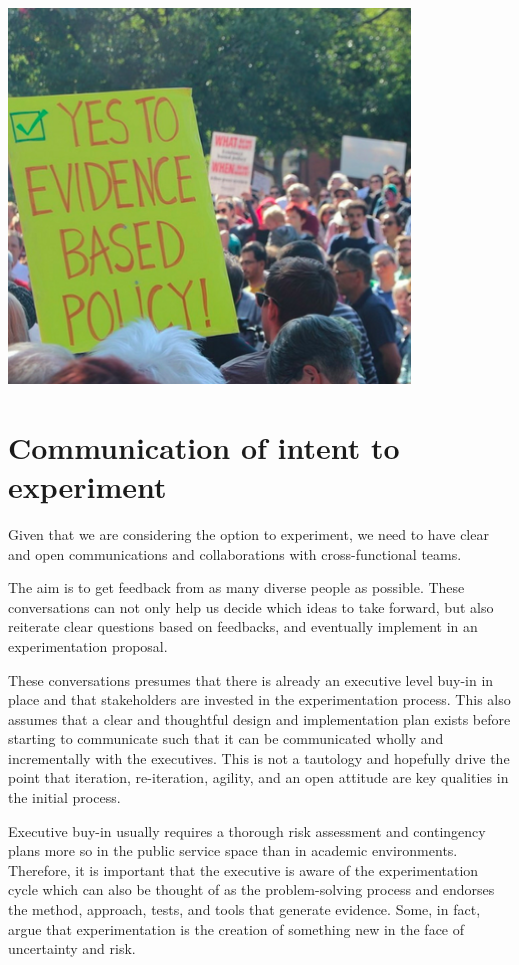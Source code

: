 \documentclass[]{book}
\begin{document}
\includegraphics[width=0.8\textwidth,height=\textheight]{fig/march4science.png}

\hypertarget{communication-of-intent-to-experiment}{%
\section{Communication of intent to experiment}\label{communication-of-intent-to-experiment}}

Given that we are considering the option to experiment, we need to have clear and open communications and collaborations with cross-functional teams.

The aim is to get feedback from as many diverse people as possible. These conversations can not only help us decide which ideas to take forward, but also reiterate clear questions based on feedbacks, and eventually implement in an experimentation proposal.

These conversations presumes that there is already an executive level buy-in in place and that stakeholders are invested in the experimentation process. This also assumes that a clear and thoughtful design and implementation plan exists before starting to communicate such that it can be communicated wholly and incrementally with the executives. This is not a tautology and hopefully drive the point that iteration, re-iteration, agility, and an open attitude are key qualities in the initial process.

Executive buy-in usually requires a thorough risk assessment and contingency plans more so in the public service space than in academic environments. Therefore, it is important that the executive is aware of the experimentation cycle which can also be thought of as the problem-solving process and endorses the method, approach, tests, and tools that generate evidence. Some, in fact, argue that experimentation is the creation of something new in the face of uncertainty and risk.
\end{document}
